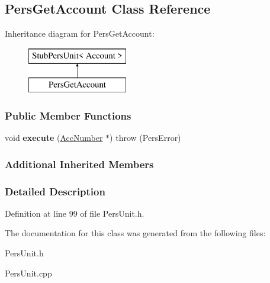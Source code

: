 \hypertarget{classPersGetAccount}{\subsection{Pers\-Get\-Account Class Reference}
\label{d1/d40/classPersGetAccount}
}
Inheritance diagram for Pers\-Get\-Account\-:\begin{figure}[H]
\begin{center}
\leavevmode
\includegraphics[height=2.000000cm]{d1/d40/classPersGetAccount}
\end{center}
\end{figure}
\subsubsection*{Public Member Functions}
\begin{DoxyCompactItemize}
\item 
\hypertarget{classPersGetAccount_aebcae427483ef6221ca67c07469d7182}{void {\bfseries execute} (\hyperlink{classAccNumber}{Acc\-Number} $\ast$)  throw (\-Pers\-Error)}\label{d1/d40/classPersGetAccount_aebcae427483ef6221ca67c07469d7182}

\end{DoxyCompactItemize}
\subsubsection*{Additional Inherited Members}


\subsubsection{Detailed Description}


Definition at line 99 of file Pers\-Unit.\-h.



The documentation for this class was generated from the following files\-:\begin{DoxyCompactItemize}
\item 
Pers\-Unit.\-h\item 
Pers\-Unit.\-cpp\end{DoxyCompactItemize}
